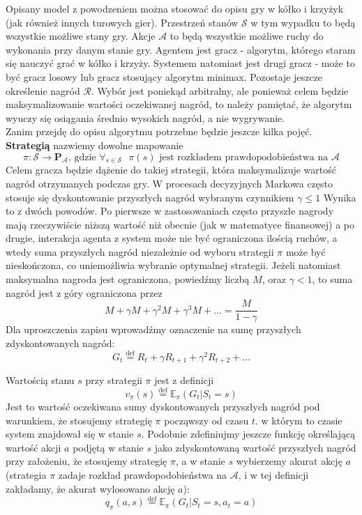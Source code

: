 \documentclass[licencjacka]{pracamgr}
\begin{document}
Opisany model z powodzeniem można stosować do opisu gry w kółko i krzyżyk (jak również innych turowych gier). Przestrzeń stanów $\mathcal{S}$ w tym wypadku to będą wszystkie możliwe stany gry. Akcje $\mathcal{A}$ to będą wszystkie możliwe ruchy do wykonania przy danym stanie gry. Agentem jest gracz - algorytm, którego staram się nauczyć grać w kółko i krzyży. Systemem natomiast jest drugi gracz - może to być gracz losowy lub gracz stosujący algorytm minimax. Pozostaje jeszcze określenie nagród $\mathcal{R}$. Wybór jest poniekąd arbitralny, ale ponieważ celem będzie maksymalizowanie wartości oczekiwanej nagród, to należy pamiętać, że algorytm wyuczy się osiągania średnio wysokich nagród, a nie wygrywanie. \\

Zanim przejdę do opisu algorytmu potrzebne będzie jeszcze kilka pojęć. \textbf{Strategią} nazwiemy dowolne mapowanie 
$$\pi : \mathcal{S}\rightarrow\mathbf{P}_{\mathcal{A}} \text{, gdzie } \forall_{s\in\mathcal{S}} \text{ } \pi(s) \text {  jest rozkładem prawdopodobieństwa na } \mathcal{A}$$ 
Celem gracza będzie dążenie do takiej strategii, która maksymalizuje wartość nagród otrzymanych podczas gry.  W procesach decyzyjnych Markowa często stosuje się dyskontowanie przyszłych nagród wybranym czynnikiem $\gamma\leq1$ Wynika to z dwóch powodów. Po pierwsze w zastosowaniach często przyszłe nagrody mają rzeczywiście niższą wartość niż obecnie (jak w matematyce finansowej) a po drugie, interakcja agenta z system może nie być ograniczona ilością ruchów, a wtedy suma przyszłych nagród niezależnie od wyboru strategii $\pi$ może być nieskończona, co uniemożliwia wybranie optymalnej strategii. Jeżeli natomiast maksymalna nagroda jest ograniczona, powiedźmy liczbą $M$, oraz $\gamma<1$, to suma nagród jest z góry ograniczona przez
$$M+\gamma M +\gamma^{2}M+\gamma^{3}M+...  = \frac{M}{1-\gamma}$$
Dla uproszczenia zapisu wprowadźmy oznaczenie na sumę przyszłych zdyskontowanych nagród:
$$G_{t} \stackrel{\text{def}}{=} R_{t} + \gamma R_{t+1} + \gamma^{2}R_{t+2} +...$$

Wartością stanu $s$ przy strategii $\pi$ jest z definicji 
$$v_{\pi}(s)\stackrel{\text{def}}{=} \mathbb{E}_{\pi}(G_{t}| S_{t} = s) $$
Jest to wartość oczekiwana sumy dyskontowanych przyszłych nagród pod warunkiem, że stosujemy strategię $\pi$ począwszy od czasu $t$. w którym to czasie system znajdował się w stanie $s$. 
Podobnie zdefiniujmy jeszcze funkcję określającą wartość akcji $a$ podjętą w stanie $s$ jako zdyskontowaną wartość przyszłych nagród przy założeniu, że stosujemy strategię $\pi$, a w stanie $s$ wybierzemy akurat akcję $a$ (strategia $\pi$ zadaje rozkład prawdopodobieństwa na $\mathcal{A}$, i w tej definicji zakładamy, że akurat wylosowano akcję $a$):
$$q_{\pi}(a,s) \stackrel{\text{def}}{=} \mathbb{E}_{\pi}(G_{t}| S_{t} = s, a_{t} = a) $$
\end{document}
